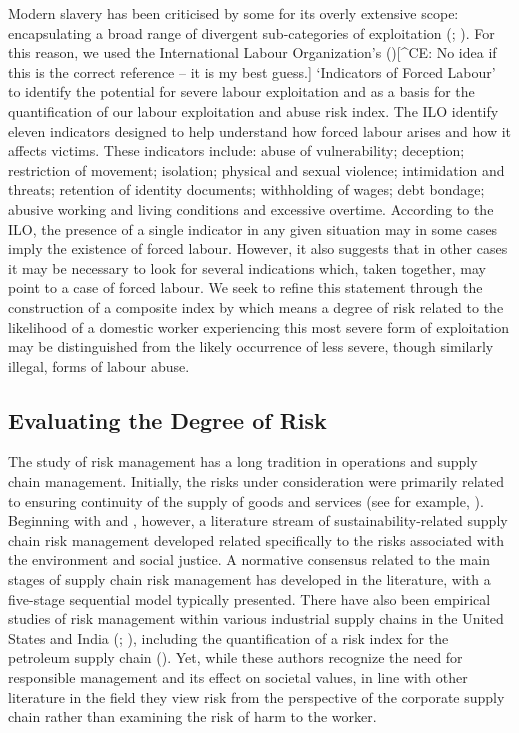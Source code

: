 \documentclass[
  12pt,
]{article}
\theoremstyle{plain}
\theoremstyle{definition}
\begin{document}
Modern slavery has been criticised by some for its overly extensive
scope: encapsulating a broad range of divergent sub-categories of
exploitation (\textcite{oconnell_davidson_margins_2015};
\textcite{gutierrez-huerter_o_change_2023}). For this reason, we used
the International Labour Organization's
(\textcite{ILO11-indicators}){[}\^{}CE: No idea if this is the correct
reference -- it is my best guess.{]} `Indicators of Forced Labour' to
identify the potential for severe labour exploitation and as a basis for
the quantification of our labour exploitation and abuse risk index. The
ILO identify eleven indicators designed to help understand how forced
labour arises and how it affects victims. These indicators include:
abuse of vulnerability; deception; restriction of movement; isolation;
physical and sexual violence; intimidation and threats; retention of
identity documents; withholding of wages; debt bondage; abusive working
and living conditions and excessive overtime. According to the ILO, the
presence of a single indicator in any given situation may in some cases
imply the existence of forced labour. However, it also suggests that in
other cases it may be necessary to look for several indications which,
taken together, may point to a case of forced labour. We seek to refine
this statement through the construction of a composite index by which
means a degree of risk related to the likelihood of a domestic worker
experiencing this most severe form of exploitation may be distinguished
from the likely occurrence of less severe, though similarly illegal,
forms of labour abuse.

\subsection{Evaluating the Degree of
Risk}\label{evaluating-the-degree-of-risk}

The study of risk management has a long tradition in operations and
supply chain management. Initially, the risks under consideration were
primarily related to ensuring continuity of the supply of goods and
services (see for example, \textcite{juttner_supply_2003}). Beginning
with \textcite{anderson_critical_2006} and
\textcite{anderson_sustainability_2009}, however, a literature stream of
sustainability-related supply chain risk management developed related
specifically to the risks associated with the environment and social
justice. A normative consensus related to the main stages of supply
chain risk management has developed in the literature, with a five-stage
sequential model typically presented. There have also been empirical
studies of risk management within various industrial supply chains in
the United States and India (\textcite{tarei_hybrid_2018};
\textcite{dellana_scale_2021}), including the quantification of a risk
index for the petroleum supply chain (\textcite{tarei_hybrid_2018}).
Yet, while these authors recognize the need for responsible management
and its effect on societal values, in line with other literature in the
field they view risk from the perspective of the corporate supply chain
rather than examining the risk of harm to the worker.
\end{document}
